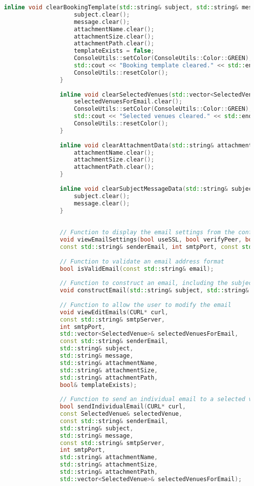 \documentclass{article}
\begin{document}
\begin{mdframed}[backgroundcolor=background, hidealllines=false, innerleftmargin=15pt, innerrightmargin=5pt, innertopmargin=0pt, innerbottommargin=-5pt, linecolor=accent]
\begin{lstlisting}[language=C++]
				inline void clearBookingTemplate(std::string& subject, std::string& message, std::string& attachmentName, std::string& attachmentSize, std::string& attachmentPath, bool& templateExists) {
					subject.clear();
					message.clear();
					attachmentName.clear();
					attachmentSize.clear();
					attachmentPath.clear();
					templateExists = false;
					ConsoleUtils::setColor(ConsoleUtils::Color::GREEN);
					std::cout << "Booking template cleared." << std::endl; 
					ConsoleUtils::resetColor();
				}
				
				inline void clearSelectedVenues(std::vector<SelectedVenue>& selectedVenuesForEmail) {
					selectedVenuesForEmail.clear();
					ConsoleUtils::setColor(ConsoleUtils::Color::GREEN);
					std::cout << "Selected venues cleared." << std::endl; 
					ConsoleUtils::resetColor();
				}
				
				inline void clearAttachmentData(std::string& attachmentName, std::string& attachmentSize, std::string& attachmentPath) {
					attachmentName.clear();
					attachmentSize.clear();
					attachmentPath.clear();
				}
				
				inline void clearSubjectMessageData(std::string& subject, std::string& message) {
					subject.clear();
					message.clear();
				}
				
				
				// Function to display the email settings from the configuration file
				void viewEmailSettings(bool useSSL, bool verifyPeer, bool verifyHost, bool verbose,  
				const std::string& senderEmail, int smtpPort, const std::string& smtpServer);
				
				// Function to validate an email address format
				bool isValidEmail(const std::string& email);
				
				// Function to construct an email, including the subject, message, and attachment details
				void constructEmail(std::string& subject, std::string& message, std::string& attachmentPath, std::string& attachmentName, std::string& attachmentSize, std::istream &in = std::cin);
				
				// Function to allow the user to modify the email
				void viewEditEmails(CURL* curl, 
				const std::string& smtpServer,
				int smtpPort,
				std::vector<SelectedVenue>& selectedVenuesForEmail,
				const std::string& senderEmail, 
				std::string& subject, 
				std::string& message, 
				std::string& attachmentName, 
				std::string& attachmentSize, 
				std::string& attachmentPath, 
				bool& templateExists);
				
				// Function to send an individual email to a selected venue
				bool sendIndividualEmail(CURL* curl,
				const SelectedVenue& selectedVenue,
				const std::string& senderEmail,
				std::string& subject,
				std::string& message,
				const std::string& smtpServer,
				int smtpPort,
				std::string& attachmentName,
				std::string& attachmentSize,
				std::string& attachmentPath,
				std::vector<SelectedVenue>& selectedVenuesForEmail);
				

\end{lstlisting}
\end{mdframed}
\end{document}
